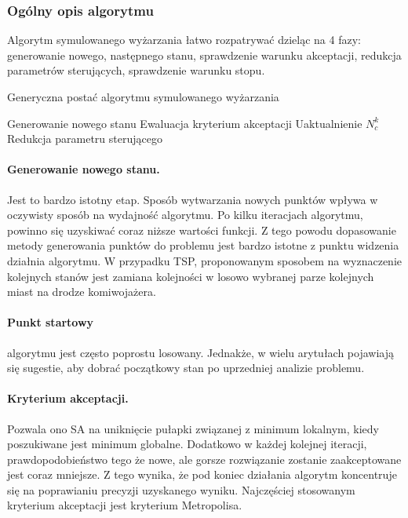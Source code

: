 \documentclass{article}
\begin{document}
\subsubsection{Ogólny opis algorytmu}
Algorytm symulowanego wyżarzania łatwo rozpatrywać dzieląc na 4 fazy: generowanie nowego, następnego stanu, sprawdzenie warunku akceptacji, redukcja parametrów sterujących, sprawdzenie warunku stopu.
    \begin{algorithm}
        \caption{Generyczna postać algorytmu symulowanego wyżarzania}
        \begin{algorithmic}
                \STATE Generowanie nowego stanu
                \STATE Ewaluacja kryterium akceptacji
            \ENDFOR
            \STATE Uaktualnienie $N_c^k$
            \STATE Redukcja parametru sterującego
        \ENDWHILE
        \end{algorithmic}
    \end{algorithm}
    
\paragraph{Generowanie nowego stanu.}
Jest to bardzo istotny etap. Sposób wytwarzania nowych punktów wpływa w oczywisty sposób na wydajność algorytmu. Po kilku iteracjach algorytmu, powinno się uzyskiwać coraz niższe wartości funkcji. Z tego powodu dopasowanie metody generowania punktów do problemu jest bardzo istotne z punktu widzenia działnia algorytmu. W przypadku TSP, proponowanym sposobem na wyznaczenie kolejnych stanów jest zamiana kolejności w losowo wybranej parze kolejnych miast na drodze komiwojażera.
\paragraph*{Punkt startowy} algorytmu jest często poprostu losowany. Jednakże, w wielu arytułach pojawiają się sugestie, aby dobrać początkowy stan po uprzedniej analizie problemu.

\paragraph{Kryterium akceptacji.}
Pozwala ono SA na uniknięcie pułapki związanej z minimum lokalnym, kiedy poszukiwane jest minimum globalne. Dodatkowo w każdej kolejnej iteracji, prawdopodobieństwo tego że nowe, ale gorsze rozwiązanie zostanie zaakceptowane jest coraz mniejsze. Z tego wynika, że pod koniec działania algorytm koncentruje się na poprawianiu precyzji uzyskanego wyniku.
Najczęściej stosowanym kryterium akceptacji jest kryterium Metropolisa.
\end{document}
